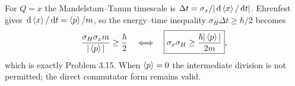 For $Q=x$ the Mandelstam–Tamm timescale is
$\Delta t=\sigma_x/|\,\mathrm{d}\left\langle x\right\rangle/\,\mathrm{d} t|$.
Ehrenfest gives $\,\mathrm{d}\left\langle x\right\rangle/\,\mathrm{d} t=\left\langle p\right\rangle/m$,
so the energy–time inequality
$\sigma_H\Delta t\ge\hbar/2$ becomes
\begin{equation}
\frac{\sigma_H\sigma_x m}{|\left\langle p\right\rangle|}
\ge\frac\hbar2
\quad\Longleftrightarrow\quad
\boxed{\sigma_x\sigma_H\ge
\frac{\hbar|\left\langle p\right\rangle|}{2m}},
\end{equation}
which is exactly Problem 3.15.
When $\left\langle p\right\rangle=0$ the intermediate division
is not permitted; the direct commutator form
remains valid.
